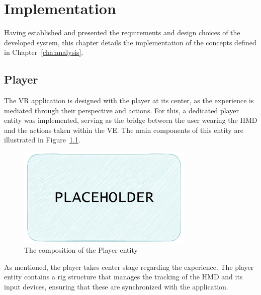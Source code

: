 
%

\chapter{Implementation}
\label{cha:implementation}

Having established and presented the requirements and design choices of the developed system, this chapter details the implementation of the concepts 
defined in Chapter~\ref{cha:analysis}. 


\section{Player}
\label{sec:player}

The \gls{VR} application is designed with the player at its center, as the experience is mediated through their perspective and actions. For this, a dedicated player entity was implemented, serving as the bridge between the user wearing the \gls{HMD} and the actions taken within the \gls{VE}. The main components of this entity are illustrated in Figure~\ref{fig:player}.

\begin{figure}[b]
    \centering
     \includegraphics[width=0.75\textwidth]{NOVAthesisFiles/Images/placeholder.pdf}
     \caption[Hierarchy of Player entity]
     {The composition of the Player entity}
     \label{fig:player}
\end{figure}

As mentioned, the player takes center stage regarding the experience. The player entity contains a rig structure that manages the tracking of 
the \gls{HMD} and its input devices, ensuring that these are synchronized with the application.

